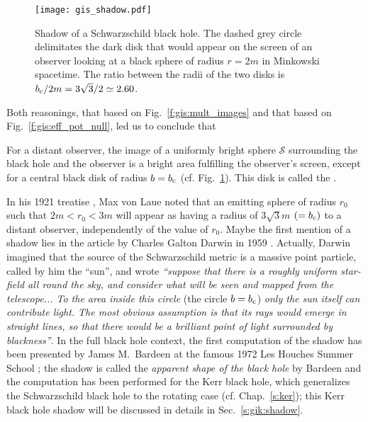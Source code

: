 \begin{figure}
\centerline{\texttt{[image: gis\_shadow.pdf]}}
\caption[]{\label{f:gis:shadow} \footnotesize
Shadow of a Schwarzschild black hole. The dashed grey circle delimitates the
dark disk that would appear on the screen of an observer looking at
a black sphere of radius $r=2m$ in Minkowski spacetime. The ratio between
the radii of the two disks is $b_{\rm c} / 2m = 3\sqrt{3}/2 \simeq 2.60$.}
\end{figure}


Both reasonings, that based on Fig.~\ref{f:gis:mult_images} and that
based on Fig.~\ref{f:gis:eff_pot_null}, led us to conclude that
\begin{prop}
For a distant observer, the image of a uniformly bright sphere $\mathscr{S}$ surrounding
the black hole and the observer is a bright area fulfilling
the observer's screen, except for a central black disk of radius $b=b_{\rm c}$
(cf. Fig.~\ref{f:gis:shadow}).
This disk is called the
.
\end{prop}

\begin{hist} \label{h:gis:bh_shadow}
In his 1921 treatise \cite{Laue1921}, Max von Laue
noted that an emitting sphere of radius $r_0$ such that $2m < r_0 < 3m$ will
appear as having a radius of $3\sqrt{3} m$ $(=b_{\rm c})$ to a distant observer,
independently of the value of $r_0$.
Maybe the first mention of a shadow lies in the article by
Charles Galton Darwin in 1959 \cite{Darwi59}. Actually,
Darwin imagined that the source of the Schwarzschild metric is a massive
point particle, called by him the ``sun'', and wrote
\emph{``suppose that there is a roughly uniform star-field all round the sky, and
consider what will be seen and mapped from the telescope... To the area inside
this circle} (the circle $b=b_{\rm c}$) \emph{only the sun itself can contribute light. The most obvious assumption is
that its rays would emerge in straight lines, so that there would be a brilliant point of
light surrounded by blackness''}. In the full black hole context, the first
computation of the shadow has been presented by James M.~Bardeen
at the famous 1972 Les Houches Summer School \cite{Barde73a}; the shadow is called the \emph{apparent shape of the black hole}
by Bardeen and the computation has been performed for the Kerr black hole,
which generalizes the Schwarzschild black hole to the rotating case (cf. Chap.~\ref{s:ker}); this
Kerr black hole shadow will be discussed in details in Sec.~\ref{s:gik:shadow}.
\end{hist}

